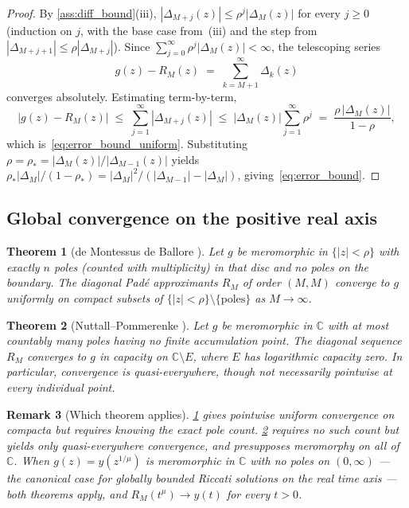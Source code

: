 \documentclass[11pt,a4paper]{article}
\newtheorem{theorem}{Theorem}[section]
\newtheorem{remark}[theorem]{Remark}
\newcommand{\C}{\mathbb{C}}
\begin{document}
\begin{proof}
By \cref{ass:diff_bound}(iii), \(|\Delta_{M+j}(z)|\le\rho^{j}|\Delta_M(z)|\) for every \(j\ge0\) (induction on \(j\), with the base case from~(iii) and the step from \(|\Delta_{M+j+1}|\le\rho|\Delta_{M+j}|\)).
Since \(\sum_{j=0}^\infty\rho^j|\Delta_M(z)|<\infty\), the telescoping series
\[
g(z)-R_M(z)\;=\;\sum_{k=M+1}^{\infty}\Delta_k(z)
\]
converges absolutely. Estimating term-by-term,
\[
|g(z)-R_M(z)|\;\le\;\sum_{j=1}^\infty|\Delta_{M+j}(z)|\;\le\;|\Delta_M(z)|\sum_{j=1}^\infty\rho^j
\;=\;\frac{\rho\,|\Delta_M(z)|}{1-\rho},
\]
which is~\eqref{eq:error_bound_uniform}. Substituting \(\rho=\rho_*=|\Delta_M(z)|/|\Delta_{M-1}(z)|\) yields
\(\rho_*|\Delta_M|/(1-\rho_*)=|\Delta_M|^2/(|\Delta_{M-1}|-|\Delta_M|)\), giving~\eqref{eq:error_bound}.
\end{proof}

\subsection{Global convergence on the positive real axis}

\begin{theorem}[de Montessus de Ballore \cite{baker1996,montessus1902}]\label{thm:dMdB}
Let \(g\) be meromorphic in \(\{|z|<\rho\}\) with exactly \(n\) poles (counted with multiplicity) in that disc and no poles on the boundary.
The diagonal Pad\'e approximants \(R_M\) of order \((M,M)\) converge to \(g\) uniformly on compact subsets of \(\{|z|<\rho\}\setminus\{\text{poles}\}\) as \(M\to\infty\).
\end{theorem}

\begin{theorem}[Nuttall--Pommerenke \cite{baker1996,nuttall1970}]\label{thm:NP}
Let \(g\) be meromorphic in \(\C\) with at most countably many poles having no finite accumulation point.
The diagonal sequence \(R_M\) converges to \(g\) \emph{in capacity} on \(\C\setminus E\), where \(E\) has logarithmic capacity zero.
In particular, convergence is quasi-everywhere, though not necessarily pointwise at every individual point.
\end{theorem}

\begin{remark}[Which theorem applies]\label{rem:which_thm}
\cref{thm:dMdB} gives \emph{pointwise} uniform convergence on compacta but requires knowing the exact pole count.
\cref{thm:NP} requires no such count but yields only quasi-everywhere convergence, and presupposes meromorphy on all of \(\C\).
When \(g(z)=y(z^{1/\mu})\) is meromorphic in \(\C\) with no poles on \((0,\infty)\) --- the canonical case for globally bounded Riccati solutions on the real time axis --- both theorems apply, and \(R_M(t^\mu)\to y(t)\) for every \(t>0\).
\end{remark}
\end{document}
